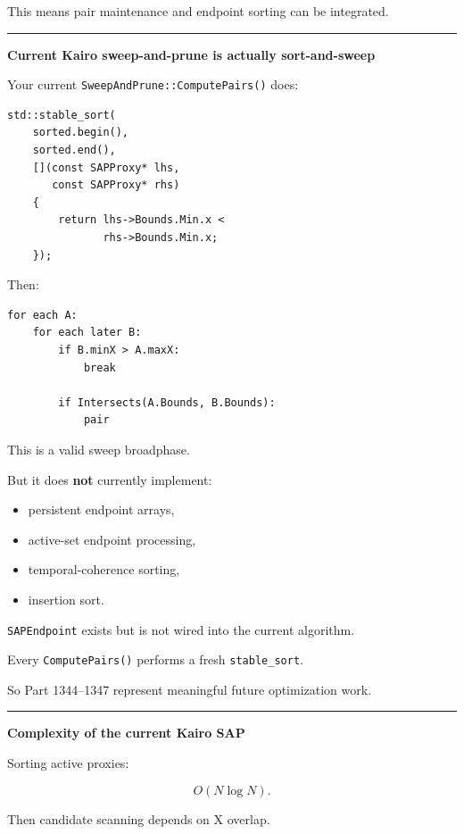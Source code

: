 This means pair maintenance and endpoint sorting can be integrated.

\begin{center}\rule{0.5\linewidth}{0.5pt}\end{center}

\textbf{Current Kairo sweep-and-prune is actually sort-and-sweep}

Your current \texttt{SweepAndPrune::ComputePairs()} does:

\begin{verbatim}
std::stable_sort(
    sorted.begin(),
    sorted.end(),
    [](const SAPProxy* lhs,
       const SAPProxy* rhs)
    {
        return lhs->Bounds.Min.x <
               rhs->Bounds.Min.x;
    });
\end{verbatim}

Then:

\begin{verbatim}
for each A:
    for each later B:
        if B.minX > A.maxX:
            break

        if Intersects(A.Bounds, B.Bounds):
            pair
\end{verbatim}

This is a valid sweep broadphase.

But it does \textbf{not} currently implement:

\begin{itemize}
\tightlist
\item
  persistent endpoint arrays,
\item
  active-set endpoint processing,
\item
  temporal-coherence sorting,
\item
  insertion sort.
\end{itemize}

\texttt{SAPEndpoint} exists but is not wired into the current algorithm.

Every \texttt{ComputePairs()} performs a fresh \texttt{stable\_sort}.

So Part 1344--1347 represent meaningful future optimization work.

\begin{center}\rule{0.5\linewidth}{0.5pt}\end{center}

\textbf{Complexity of the current Kairo SAP}

Sorting active proxies:

\[
O(N\log N).
\]

Then candidate scanning depends on X overlap.


